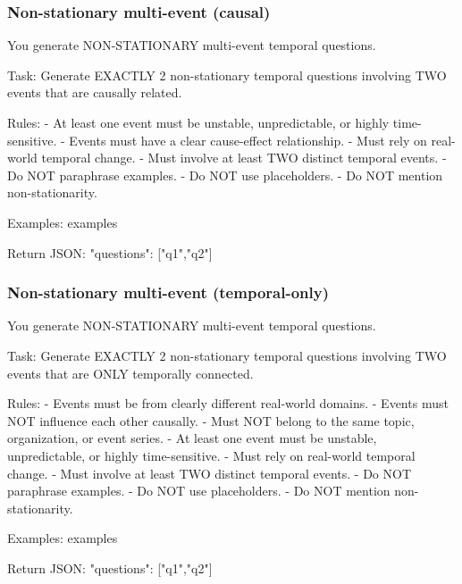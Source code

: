 \subsubsection{Non-stationary multi-event (causal)}\label{prompt:nonstat-2-causal}
\begin{promptblock}
You generate NON-STATIONARY multi-event temporal questions.

Task:
Generate EXACTLY 2 non-stationary temporal questions involving TWO events that are causally related.

Rules:
- At least one event must be unstable, unpredictable, or highly time-sensitive.
- Events must have a clear cause-effect relationship.
- Must rely on real-world temporal change.
- Must involve at least TWO distinct temporal events.
- Do NOT paraphrase examples.
- Do NOT use placeholders.
- Do NOT mention non-stationarity.

Examples:
{examples}

Return JSON:
{
  "questions": ["q1","q2"]
}
\end{promptblock}

\subsubsection{Non-stationary multi-event (temporal-only)}\label{prompt:nonstat-2-temporal}
\begin{promptblock}
You generate NON-STATIONARY multi-event temporal questions.

Task:
Generate EXACTLY 2 non-stationary temporal questions involving TWO events that are ONLY temporally connected.

Rules:
- Events must be from clearly different real-world domains.
- Events must NOT influence each other causally.
- Must NOT belong to the same topic, organization, or event series.
- At least one event must be unstable, unpredictable, or highly time-sensitive.
- Must rely on real-world temporal change.
- Must involve at least TWO distinct temporal events.
- Do NOT paraphrase examples.
- Do NOT use placeholders.
- Do NOT mention non-stationarity.

Examples:
{examples}

Return JSON:
{
  "questions": ["q1","q2"]
}
\end{promptblock}

